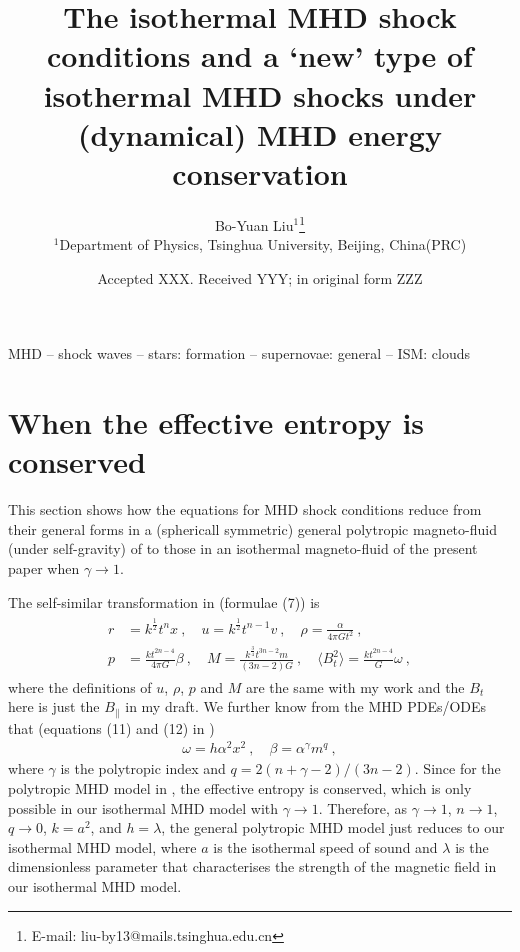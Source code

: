 \documentclass[fleqn,usenatbib]{mnras}
\title[Report on August 16]{The isothermal MHD shock conditions and a `new' type of isothermal MHD shocks under (dynamical) MHD energy conservation}
\author[Bo-Yuan Liu]{Bo-Yuan Liu$^{1}$\thanks{E-mail: liu-by13@mails.tsinghua.edu.cn}
\\
$^{1}$Department of Physics, Tsinghua University, Beijing, China(PRC)\\
}
\date{Accepted XXX. Received YYY; in original form ZZZ}
\begin{document}
\label{firstpage}
\pagerange{\pageref{firstpage}--\pageref{lastpage}}
\maketitle
\begin{keywords}
MHD -- shock waves -- stars: formation -- supernovae: general -- ISM: clouds
\end{keywords}



 
\section{When the effective entropy is conserved}
This section shows how the equations for MHD shock conditions reduce from their general forms in a (sphericall symmetric) general polytropic magneto-fluid (under self-gravity) of \citet{wang2008dynamic} to those in an isothermal magneto-fluid of the present paper when $\gamma\rightarrow 1$.

The self-similar transformation in \citet{wang2008dynamic} (formulae (7)) is
\begin{gather}
\begin{split}
r&=k^{\frac{1}{2}}t^{n}x\ ,\quad u=k^{\frac{1}{2}}t^{n-1}v\ ,\quad \rho=\frac{\alpha}{4\pi Gt^{2}}\ ,\\
p&=\frac{kt^{2n-4}}{4\pi G}\beta\ ,\quad M=\frac{k^{\frac{3}{4}}t^{3n-2}m}{(3n-2)G}\ ,\quad \langle B^{2}_{t}\rangle=\frac{kt^{2n-4}}{G}\omega\ ,
\end{split}\label{e1}
\end{gather}
where the definitions of $u$, $\rho$, $p$ and $M$ are
the same with my work and the $B_{t}$ here is just the $B_{\parallel}$ in my draft. We further know from the MHD PDEs/ODEs that (equations (11) and (12) in \citet{wang2008dynamic}) 
\begin{gather}
\omega=h\alpha^{2}x^{2}\ ,\quad \beta=\alpha^{\gamma}m^{q}\ ,\label{e2}
\end{gather}
where $\gamma$ is the polytropic index and $q=2(n+\gamma-2)/(3n-2)$. Since for the polytropic MHD model in \citet{wang2008dynamic}, the effective entropy is conserved, which is only possible in our isothermal MHD model with $\gamma\rightarrow 1$. Therefore, as $\gamma\rightarrow 1$, $n\rightarrow 1$, $q\rightarrow 0$, $k=a^{2}$, and $h=\lambda$, the general polytropic MHD model just reduces to our isothermal MHD model, where $a$ is the isothermal speed of sound and $\lambda$ is the dimensionless parameter that characterises the strength of the magnetic field in our isothermal MHD model.
\end{document}
